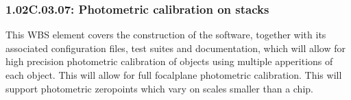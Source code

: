 \subsubsection{1.02C.03.07: Photometric calibration on stacks}

This WBS element covers the construction of the software, together with
its associated configuration files, test suites and documentation, which
will allow for high precision photometric calibration of objects using
multiple apperitions of each object.  This will allow for full focalplane
photometric calibration.  This will support photometric zeropoints which
vary on scales smaller than a chip.
